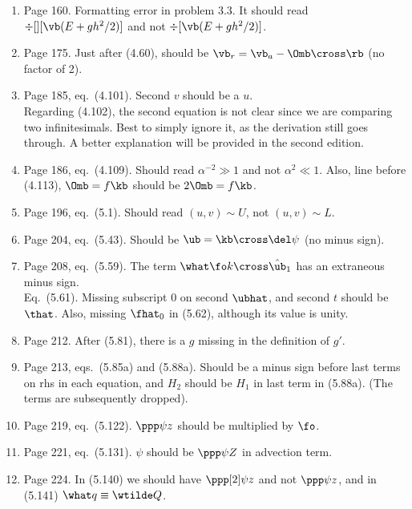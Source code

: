 \documentclass[10pt]{article}
\newcommand{\eq}{eq.\ } \newcommand{\Eq}{Eq.\ }
\begin{document}
\begin{enumerate}
\item Page 160. Formatting error in problem 3.3. It should read $\div[][\vb(E + gh^2/2)]$ and not $\div[\vb(E + gh^2/2)]$. 

\item Page 175. Just after (4.60), should be $\vb_r = \vb_a - \Omb \cross \rb$ (no factor of 2).

\item Page 185, \eq (4.101). Second $v$ should be a $u$. \\ Regarding (4.102), the second equation is not clear since we are comparing two infinitesimals. Best to simply ignore it, as the derivation still goes through. A better explanation will be provided in the second edition.  

\item Page 186, \eq (4.109). Should read $\alpha^{-2} \gg 1$ and not $\alpha^2 \ll 1$. Also, line before (4.113), $\Omb = f \kb$ should be $2\Omb = f \kb$.

\item Page 196, \eq (5.1). Should read $(u, v) \sim U$, not $(u,v) \sim L$.

\item Page 204, \eq (5.43). Should be $\ub = \kb \cross \del \psi$ (no minus sign). 

\item Page 208, \eq (5.59). The term $\what \fo k\cross\hat{\ub}_1$ has an extraneous minus sign. \\
\Eq (5.61). Missing subscript 0 on second $\ubhat$, and second $t$ should be $\that$. Also, missing $\fhat_0$ in (5.62), although its value is unity.

\item Page 212. After (5.81), there is a $g$ missing in the definition of $g'$.

\item Page 213, eqs.\ (5.85a) and (5.88a). Should be a minus sign before last terms on rhs in each equation, and $H_2$ should be $H_1$ in last term in (5.88a). (The terms are subsequently dropped).  

\item Page 219, \eq (5.122). $\ppp \psi z$ should be multiplied by $\fo$.

\item Page 221, \eq(5.131). $\psi$ should be $\ppp \psi Z$ in advection term.

\item Page 224. In (5.140) we should have $\ppp[2] \psi z$ and not $\ppp \psi z$, and in (5.141) $\what q \equiv \wtilde Q$. 


\end{enumerate}
\end{document}
